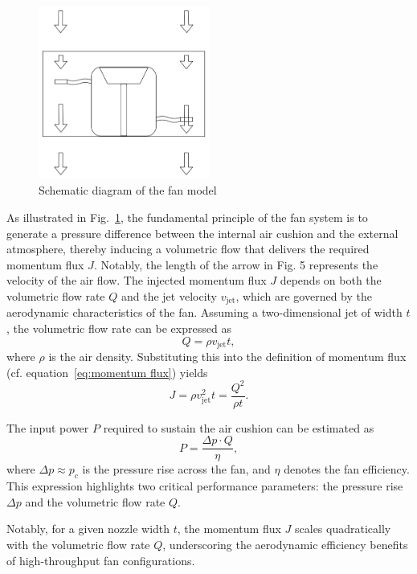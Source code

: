 \begin{figure}[H]
  \centering
  \includegraphics[width=0.5\textwidth, height=0.45\textwidth]{images/FanModel.png}
  \caption{Schematic diagram of the fan model}
  \label{fig:FanModel}
\end{figure}

As illustrated in Fig.~\ref{fig:FanModel}, the fundamental principle of the fan system is to generate a pressure difference between the internal air cushion and the external atmosphere, thereby inducing a volumetric flow that delivers the required momentum flux \( J \). Notably, the length of the arrow in Fig. 5 represents the velocity of the air flow.
The injected momentum flux \( J \) depends on both the volumetric flow rate \( Q \) and the jet velocity \( v_{\text{jet}} \), which are governed by the aerodynamic characteristics of the fan. Assuming a two-dimensional jet of width \( t \), the volumetric flow rate can be expressed as
\begin{equation}
    Q = \rho v_{\text{jet}} t,
\end{equation}
where \( \rho \) is the air density. Substituting this into the definition of momentum flux (cf. equation~\eqref{eq:momentum flux}) yields
\begin{equation} \label{eq:Mj_revisited}
    J = \rho v_{\text{jet}}^2 t = \frac{Q^2}{\rho t}.
\end{equation}

The input power \( P \) required to sustain the air cushion can be estimated as
\begin{equation}
    P = \frac{\Delta p \cdot Q}{\eta},
\end{equation}
where \( \Delta p \approx p_c \) is the pressure rise across the fan, and \( \eta \) denotes the fan efficiency. This expression highlights two critical performance parameters: the pressure rise \( \Delta p \) and the volumetric flow rate \( Q \).

Notably, for a given nozzle width \( t \), the momentum flux \( J \) scales quadratically with the volumetric flow rate \( Q \), underscoring the aerodynamic efficiency benefits of high-throughput fan configurations.

